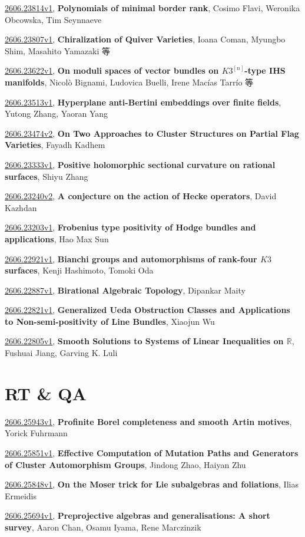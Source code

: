 \documentclass[9pt, a4paper]{article}
\theoremstyle{plain}
\theoremstyle{definition}
\theoremstyle{remark}
\newcommand{\arxiv}[3]{\href{https://arxiv.org/abs/#1}{#1}, \textbf{\textcolor{arxivblue}{#2}}, #3}
\begin{document}
\arxiv{2606.23814v1}{Polynomials of minimal border rank}{Cosimo Flavi, Weronika Obcowska, Tim Seynnaeve}

\arxiv{2606.23807v1}{Chiralization of Quiver Varieties}{Ioana Coman, Myungbo Shim, Masahito Yamazaki 等}

\arxiv{2606.23622v1}{On moduli spaces of vector bundles on $K3^{[n]}$-type IHS manifolds}{Nicolò Bignami, Ludovica Buelli, Irene Macías Tarrío 等}

\arxiv{2606.23513v1}{Hyperplane anti-Bertini embeddings over finite fields}{Yutong Zhang, Yaoran Yang}

\arxiv{2606.23474v2}{On Two Approaches to Cluster Structures on Partial Flag Varieties}{Fayadh Kadhem}

\arxiv{2606.23333v1}{Positive holomorphic sectional curvature on rational surfaces}{Shiyu Zhang}

\arxiv{2606.23240v2}{A conjecture on the action of Hecke operators}{David Kazhdan}

\arxiv{2606.23203v1}{Frobenius type positivity of Hodge bundles and applications}{Hao Max Sun}

\arxiv{2606.22921v1}{Bianchi groups and automorphisms of rank-four $K3$ surfaces}{Kenji Hashimoto, Tomoki Oda}

\arxiv{2606.22887v1}{Birational Algebraic Topology}{Dipankar Maity}

\arxiv{2606.22821v1}{Generalized Ueda Obstruction Classes and Applications to Non-semi-positivity of Line Bundles}{Xiaojun Wu}

\arxiv{2606.22805v1}{Smooth Solutions to Systems of Linear Inequalities on $\mathbb{R}$}{Fushuai Jiang, Garving K. Luli}


\section{RT \& QA}
\arxiv{2606.25943v1}{Profinite Borel completeness and smooth Artin motives}{Yorick Fuhrmann}

\arxiv{2606.25851v1}{Effective Computation of Mutation Paths and Generators of Cluster Automorphism Groups}{Jindong Zhao, Haiyan Zhu}

\arxiv{2606.25848v1}{On the Moser trick for Lie subalgebras and foliations}{Ilias Ermeidis}

\arxiv{2606.25694v1}{Preprojective algebras and generalisations: A short survey}{Aaron Chan, Osamu Iyama, Rene Marczinzik}
\end{document}
